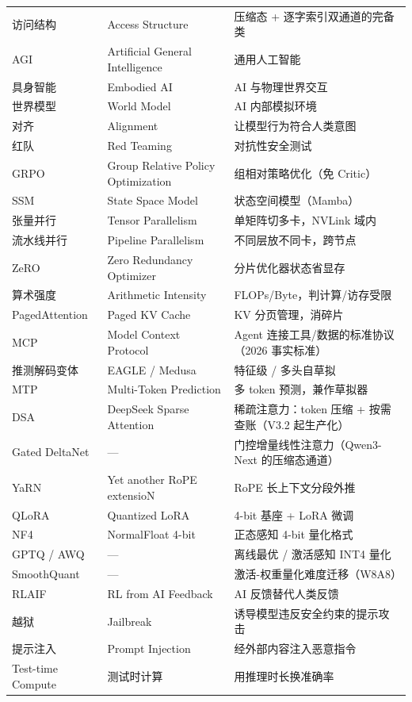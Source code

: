 \documentclass[12pt,a4paper]{article}
\begin{document}
\begin{longtable}{@{}>{\raggedright\arraybackslash}p{3.6cm}>{\raggedright\arraybackslash}p{4.6cm}p{6.8cm}@{}}
访问结构 & Access Structure & 压缩态 + 逐字索引双通道的完备类\\
AGI & Artificial General Intelligence & 通用人工智能\\
具身智能 & Embodied AI & AI 与物理世界交互\\
世界模型 & World Model & AI 内部模拟环境\\
对齐 & Alignment & 让模型行为符合人类意图\\
红队 & Red Teaming & 对抗性安全测试\\
GRPO & Group Relative Policy Optimization & 组相对策略优化（免 Critic）\\
SSM & State Space Model & 状态空间模型（Mamba）\\
张量并行 & Tensor Parallelism & 单矩阵切多卡，NVLink 域内\\
流水线并行 & Pipeline Parallelism & 不同层放不同卡，跨节点\\
ZeRO & Zero Redundancy Optimizer & 分片优化器状态省显存\\
算术强度 & Arithmetic Intensity & FLOPs/Byte，判计算/访存受限\\
PagedAttention & Paged KV Cache & KV 分页管理，消碎片\\
MCP & Model Context Protocol & Agent 连接工具/数据的标准协议（2026 事实标准）\\
推测解码变体 & EAGLE / Medusa & 特征级 / 多头自草拟\\
MTP & Multi-Token Prediction & 多 token 预测，兼作草拟器\\
DSA & DeepSeek Sparse Attention & 稀疏注意力：token 压缩 + 按需查账（V3.2 起生产化）\\
Gated DeltaNet & --- & 门控增量线性注意力（Qwen3-Next 的压缩态通道）\\
YaRN & Yet another RoPE extensioN & RoPE 长上下文分段外推\\
QLoRA & Quantized LoRA & 4-bit 基座 + LoRA 微调\\
NF4 & NormalFloat 4-bit & 正态感知 4-bit 量化格式\\
GPTQ / AWQ & — & 离线最优 / 激活感知 INT4 量化\\
SmoothQuant & — & 激活-权重量化难度迁移（W8A8）\\
RLAIF & RL from AI Feedback & AI 反馈替代人类反馈\\
越狱 & Jailbreak & 诱导模型违反安全约束的提示攻击\\
提示注入 & Prompt Injection & 经外部内容注入恶意指令\\
Test-time Compute & 测试时计算 & 用推理时长换准确率\\

\end{longtable}
\end{document}
